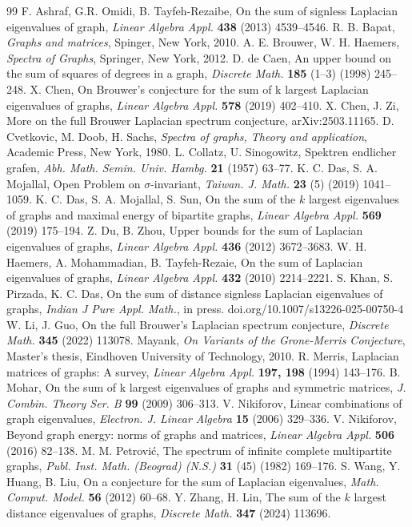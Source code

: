 \documentclass[12pt]{article}
\begin{document}
 \begin{thebibliography}{99}
  F. Ashraf, G.R. Omidi, B. Tayfeh-Rezaibe, On the sum of signless Laplacian eigenvalues of graph, {\it Linear Algebra Appl.\/} {\bf 438} (2013) 4539--4546.
  R. B. Bapat, {\it Graphs and matrices\/}, Spinger, New York, 2010.
  A. E. Brouwer, W. H. Haemers, {\it Spectra of Graphs\/}, Springer, New York, 2012.
  D. de Caen, An upper bound on the sum of squares of degrees in a graph, {\it Discrete Math.\/} {\bf 185} (1--3) (1998) 245--248.
  X. Chen, On Brouwer's conjecture for the sum of k largest Laplacian eigenvalues of graphs, {\it Linear Algebra Appl.\/} {\bf 578} (2019) 402--410.
  X. Chen, J. Zi, More on the full Brouwer Laplacian spectrum conjecture, arXiv:2503.11165.
  D. Cvetkovic, M. Doob, H. Sachs, {\it Spectra of graphs, Theory and application\/}, Academic Press, New York, 1980.
  L. Collatz, U. Sinogowitz, Spektren endlicher grafen, {\it Abh. Math. Semin. Univ. Hambg.\/} {\bf 21} (1957) 63--77.
 K. C. Das, S. A. Mojallal, Open Problem on $\sigma$-invariant, {\it Taiwan. J. Math.\/} {\bf 23} (5) (2019) 1041--1059.
 K. C. Das, S. A. Mojallal, S. Sun, On the sum of the $k$ largest eigenvalues of graphs and maximal energy of bipartite graphs, {\it Linear Algebra Appl.\/} {\bf 569} (2019) 175--194.
 Z. Du, B. Zhou, Upper bounds for the sum of Laplacian eigenvalues of graphs, {\it Linear Algebra Appl.\/} {\bf 436} (2012) 3672--3683.
 W. H. Haemers, A. Mohammadian, B. Tayfeh-Rezaie, On the sum of Laplacian eigenvalues of graphs, {\it Linear Algebra Appl.\/} {\bf 432} (2010) 2214--2221.
  S. Khan, S. Pirzada, K. C. Das, On the sum of distance signless Laplacian eigenvalues of graphs, {\it Indian J Pure Appl. Math.\/}, in press. doi.org/10.1007/s13226-025-00750-4
 W. Li, J. Guo, On the full Brouwer's Laplacian spectrum conjecture, {\it Discrete Math.\/} {\bf 345} (2022) 113078.
  Mayank, {\it On Variants of the Grone-Merris Conjecture\/}, Master's thesis, Eindhoven University of Technology, 2010.
  R. Merris, Laplacian matrices of graphs: A survey, {\it Linear Algebra Appl.\/} {\bf 197, 198} (1994) 143--176.
  B. Mohar, On the sum of k largest eigenvalues of graphs and symmetric matrices, {\it J. Combin. Theory Ser. B\/} {\bf 99} (2009) 306--313. 
   V. Nikiforov, Linear combinations of graph eigenvalues, {\it Electron. J. Linear Algebra\/} {\bf 15} (2006) 329--336.
  V. Nikiforov, Beyond graph energy: norms of graphs and matrices, {\it Linear Algebra Appl.\/} {\bf 506} (2016) 82--138.
  M. M. Petrovi\'{c}, The spectrum of infinite complete multipartite graphs, {\it Publ. Inst. Math. (Beograd) (N.S.)\/} {\bf 31} (45) (1982) 169--176.
 S. Wang, Y. Huang, B. Liu, On a conjecture for the sum of Laplacian eigenvalues, {\it Math. Comput. Model.\/} {\bf 56} (2012) 60--68.
  Y. Zhang, H. Lin, The sum of the $k$ largest distance eigenvalues of graphs, {\it Discrete Math.\/} {\bf 347} (2024) 113696.
 \end{thebibliography}

 
\end{document}
